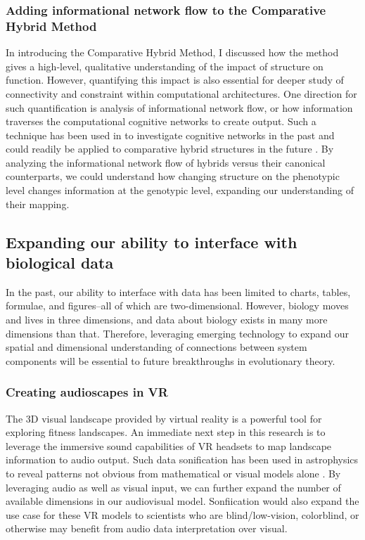 \subsubsection{Adding informational network flow to the Comparative Hybrid Method}

In introducing the Comparative Hybrid Method, I discussed how the method gives a high-level, qualitative understanding of the impact of structure on function. 
However, quantifying this impact is also essential for deeper study of connectivity and constraint within computational architectures.
One direction for such quantification is analysis of informational network flow, or how information traverses the computational cognitive networks to create output.
Such a technique has been used in to investigate cognitive networks in the past and could readily be applied to comparative hybrid structures in the future \citep{bohm_information_2022}. 
By analyzing the informational network flow of hybrids versus their canonical counterparts, we could understand how changing structure on the phenotypic level changes information at the genotypic level, expanding our understanding of their mapping.

\subsection{Expanding our ability to interface with biological data}

In the past, our ability to interface with data has been limited to charts, tables, formulae, and figures--all of which are two-dimensional. However, biology moves and lives in three dimensions, and data about biology exists in many more dimensions than that. Therefore, leveraging emerging technology to expand our spatial and dimensional understanding of connections between system components will be essential to future breakthroughs in evolutionary theory.

\subsubsection{Creating audioscapes in VR}

The 3D visual landscape provided by virtual reality is a powerful tool for exploring fitness landscapes. 
An immediate next step in this research is to leverage the immersive sound capabilities of VR headsets to map landscape information to audio output. 
Such data sonification has been used in astrophysics to reveal patterns not obvious from mathematical or visual models alone \citep{gibney_how_2020}.
By leveraging audio as well as visual input, we can further expand the number of available dimensions in our audiovisual model.
Sonfiication would also expand the use case for these VR models to scientists who are blind/low-vision, colorblind, or otherwise may benefit from audio data interpretation over visual.

